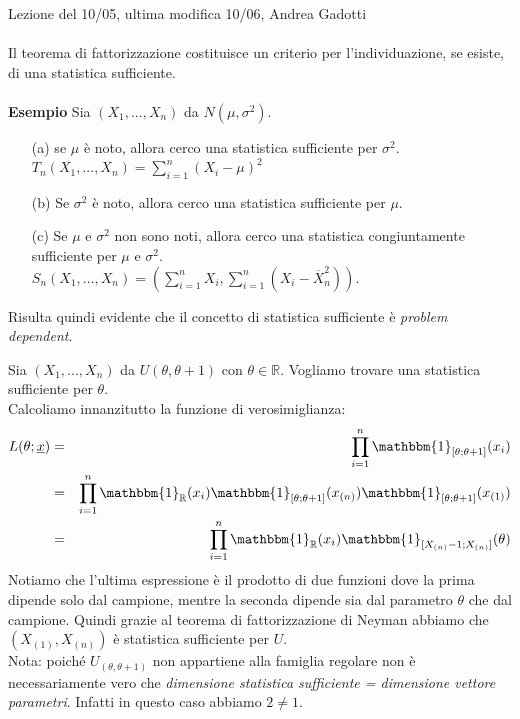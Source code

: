 
Lezione del 10/05, ultima modifica 10/06, Andrea Gadotti\\
\\
Il teorema di fattorizzazione costituisce un criterio per l'individuazione, se esiste, di una statistica sufficiente.
\\
\\
\textbf{Esempio} Sia $(X_1,...,X_n)$ da $N(\mu,\sigma^2)$.
\begin{enumerate}
\item [(a)] se $\mu$ è noto, allora cerco una statistica sufficiente per $\sigma^2$.\\
$T_n (X_1,...,X_n) = \displaystyle\sum_{i=1}^n (X_i-\mu)^2$
\item [(b)] Se $\sigma^2$ è noto, allora cerco una statistica sufficiente per $\mu$.
\item [(c)] Se $\mu$ e $\sigma^2$ non sono noti, allora cerco una statistica congiuntamente sufficiente per $\mu$ e $\sigma^2$.\\
$S_n (X_1,...,X_n) = \left( \sum_{i=1}^n X_i, \sum_{i=1}^n (X_i - \overline{X}_n^2) \right)$.
\end{enumerate}

Risulta quindi evidente che il concetto di statistica sufficiente è \emph{problem dependent}.
\\
\begin{esempio} Sia $(X_1,...,X_n)$ da $U(\theta, \theta +1)$ con $\theta \in \mathbb{R}$. Vogliamo trovare una statistica sufficiente per $\theta$.\\
Calcoliamo innanzitutto la funzione di verosimiglianza:
\begin{eqnarray}
L(\theta;\underline{x}) &=& \displaystyle\prod_{i=1}^n \mathbbm{1}_{[\theta; \theta +1]}(x_i)\\
&=& \displaystyle\prod_{i=1}^n \mathbbm{1}_{\mathbb{R}}(x_i) \mathbbm{1}_{[\theta; \theta +1]}(x_{(n)}) \mathbbm{1}_{[\theta; \theta +1]}(x_{(1)})\\
&=& \displaystyle\prod_{i=1}^n \mathbbm{1}_{\mathbb{R}}(x_i) \mathbbm{1}_{[X_{(n)}-1; X_{(n)}]}(\theta)
\end{eqnarray}
Notiamo che l'ultima espressione è il prodotto di due funzioni dove la prima dipende solo dal campione, mentre la seconda dipende sia dal parametro $\theta$ che dal campione. Quindi grazie al teorema di fattorizzazione di Neyman abbiamo che $(X_{(1)},X_{(n)})$ è statistica sufficiente per $U$.\\
Nota: poiché $U_{(\theta, \theta +1)}$ non appartiene alla famiglia regolare non è necessariamente vero che \emph{dimensione statistica sufficiente = dimensione vettore parametri}. Infatti in questo caso abbiamo $2 \neq 1$.
\end{esempio}

